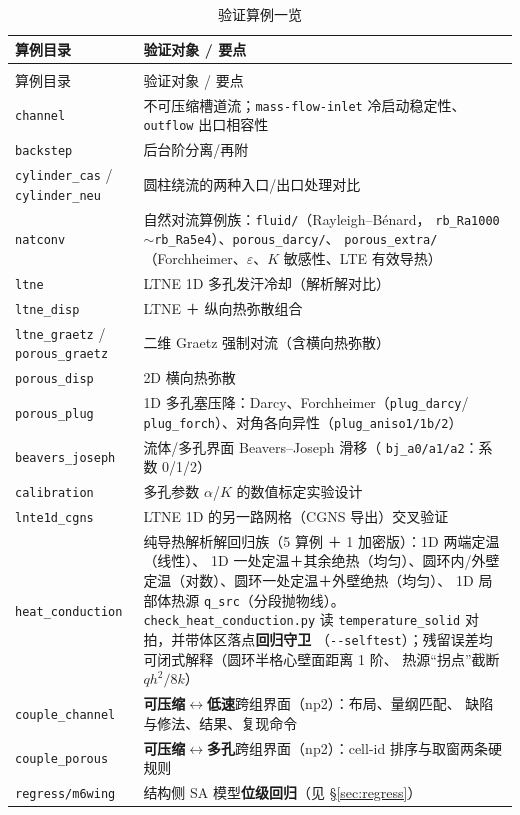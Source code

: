 \documentclass[11pt,a4paper]{ctexart}
\begin{document}
{\small
\begin{longtable}{@{}>{\raggedright\arraybackslash}p{}>{\raggedright\arraybackslash}p{}@{}}
\caption{验证算例一览}\label{tab:cases}\\
\toprule
算例目录 & 验证对象 / 要点 \\
\midrule
\endfirsthead
\multicolumn{2}{@{}l}{\small\itshape 表~\ref{tab:cases}（续）}\\
\toprule
算例目录 & 验证对象 / 要点 \\
\midrule
\endhead
\bottomrule
\endlastfoot
\texttt{channel} & 不可压缩槽道流；\texttt{mass-flow-inlet} 冷启动稳定性、\texttt{outflow} 出口相容性 \\
\texttt{backstep} & 后台阶分离/再附 \\
\texttt{cylinder\_cas} / \texttt{cylinder\_neu} & 圆柱绕流的两种入口/出口处理对比 \\
\texttt{natconv} & 自然对流算例族：\texttt{fluid/}（Rayleigh--B\'enard，
 \texttt{rb\_Ra1000}$\sim$\texttt{rb\_Ra5e4}）、\texttt{porous\_darcy/}、
 \texttt{porous\_extra/}（Forchheimer、$\varepsilon$、$K$ 敏感性、LTE 有效导热） \\
\texttt{ltne} & LTNE 1D 多孔发汗冷却（解析解对比） \\
\texttt{ltne\_disp} & LTNE ＋ 纵向热弥散组合 \\
\texttt{ltne\_graetz} / \texttt{porous\_graetz} & 二维 Graetz 强制对流（含横向热弥散） \\
\texttt{porous\_disp} & 2D 横向热弥散 \\
\texttt{porous\_plug} & 1D 多孔塞压降：Darcy、Forchheimer（\texttt{plug\_darcy}/
 \texttt{plug\_forch}）、对角各向异性（\texttt{plug\_aniso1/1b/2}） \\
\texttt{beavers\_joseph} & 流体/多孔界面 Beavers--Joseph 滑移（
 \texttt{bj\_a0/a1/a2}：系数 0/1/2） \\
\texttt{calibration} & 多孔参数 $\alpha$/$K$ 的数值标定实验设计 \\
\texttt{lnte1d\_cgns} & LTNE 1D 的另一路网格（CGNS 导出）交叉验证 \\
\texttt{heat\_conduction} & 纯导热解析解回归族（5 算例 ＋ 1 加密版）：1D 两端定温（线性）、
 1D 一处定温＋其余绝热（均匀）、圆环内/外壁定温（对数）、圆环一处定温＋外壁绝热（均匀）、
 1D 局部体热源 \texttt{q\_src}（分段抛物线）。\texttt{check\_heat\_conduction.py}
 读 \texttt{temperature\_solid} 对拍，并带体区落点\textbf{回归守卫}
 （\texttt{-{}-selftest}）；残留误差均可闭式解释（圆环半格心壁面距离 1 阶、
 热源``拐点''截断 $q h^2/8k$） \\
\texttt{couple\_channel} & \textbf{可压缩$\leftrightarrow$低速}跨组界面（np2）：布局、量纲匹配、
 缺陷与修法、结果、复现命令 \\
\texttt{couple\_porous} & \textbf{可压缩$\leftrightarrow$多孔}跨组界面（np2）：cell-id
 排序与取窗两条硬规则 \\
\texttt{regress/m6wing} & 结构侧 SA 模型\textbf{位级回归}（见 \S\ref{sec:regress}） \\
\end{longtable}
}
\end{document}
